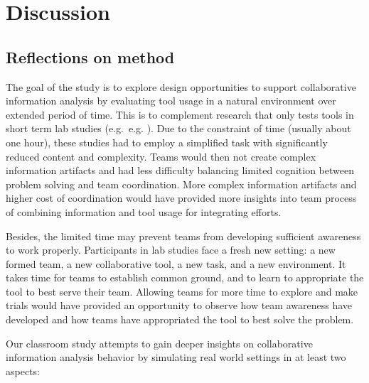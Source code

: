 \section{Discussion}\label{discussion}

\subsection{Reflections on method}\label{reflections-on-method}

The goal of the study is to explore design opportunities to support
collaborative information analysis by evaluating tool usage in a natural
environment over extended period of time. This is to complement research
that only tests tools in short term lab studies (e.g.~e.g.
\autocites{Convertino2012}{Goyal2016}). Due to the constraint of time
(usually about one hour), these studies had to employ a simplified task
with significantly reduced content and complexity. Teams would then not
create complex information artifacts and had less difficulty balancing
limited cognition between problem solving and team coordination. More
complex information artifacts and higher cost of coordination would have
provided more insights into team process of combining information and
tool usage for integrating efforts.

Besides, the limited time may prevent teams from developing sufficient
awareness to work properly. Participants in lab studies face a fresh new
setting: a new formed team, a new collaborative tool, a new task, and a
new environment. It takes time for teams to establish common ground, and
to learn to appropriate the tool to best serve their team. Allowing
teams for more time to explore and make trials would have provided an
opportunity to observe how team awareness have developed and how teams
have appropriated the tool to best solve the problem.

Our classroom study attempts to gain deeper insights on collaborative
information analysis behavior by simulating real world settings in at
least two aspects:


